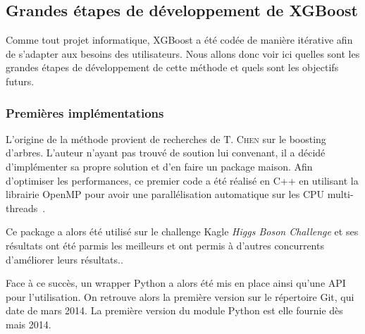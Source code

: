 \subsection{Grandes étapes de développement de XGBoost}
\label{sec:historique}
Comme tout projet informatique, XGBoost a été codée de manière itérative afin de s'adapter aux besoins des utilisateurs. Nous allons donc voir ici quelles sont les grandes étapes de développement de cette méthode et quels sont les objectifs futurs.

\subsubsection{Premières implémentations}
L'origine de la méthode provient de recherches de T. \textsc{Chen} sur le boosting d'arbres. L'auteur n'ayant pas trouvé de soution lui convenant, il a décidé d'implémenter sa propre solution et d'en faire un package \og maison\fg. Afin d'optimiser les performances, ce premier code a été réalisé en C++ en utilisant la librairie OpenMP pour avoir une parallélisation automatique sur les CPU multi-threads~\cite{bib:boson}.

Ce package a alors été utilisé sur le challenge Kagle \textit{Higgs Boson Challenge} et ses résultats ont été parmis les meilleurs et ont permis à d'autres concurrents d'améliorer leurs résultats..

Face à ce succès, un wrapper Python a alors été mis en place ainsi qu'une API pour l'utilisation. On retrouve alors la première version sur le répertoire Git, qui date de mars 2014. La première version du module Python est elle fournie dès mais 2014.

